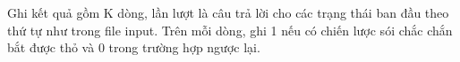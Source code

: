 Ghi kết quả gồm K dòng, lần lượt là câu trả lời cho các trạng thái ban đầu theo thứ tự như trong file input. Trên mỗi dòng, ghi 1 nếu có chiến lược sói chắc chắn bắt được thỏ và 0 trong trường hợp ngược lại.